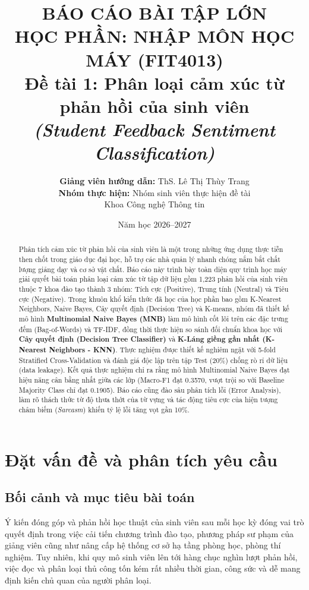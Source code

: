 \documentclass[12pt,a4paper]{article}
\title{\textbf{BÁO CÁO BÀI TẬP LỚN}\\
\textbf{HỌC PHẦN: NHẬP MÔN HỌC MÁY (FIT4013)}\\
\large \textbf{Đề tài 1: Phân loại cảm xúc từ phản hồi của sinh viên}\\
\textit{(Student Feedback Sentiment Classification)}}
\author{
    \textbf{Giảng viên hướng dẫn:} ThS. Lê Thị Thùy Trang\\
    \textbf{Nhóm thực hiện:} Nhóm sinh viên thực hiện đề tài\\
    Khoa Công nghệ Thông tin
}
\date{Năm học 2026--2027}
\begin{document}
\maketitle

\begin{abstract}
Phân tích cảm xúc từ phản hồi của sinh viên là một trong những ứng dụng thực tiễn then chốt trong giáo dục đại học, hỗ trợ các nhà quản lý nhanh chóng nắm bắt chất lượng giảng dạy và cơ sở vật chất. Báo cáo này trình bày toàn diện quy trình học máy giải quyết bài toán phân loại cảm xúc từ tập dữ liệu gồm 1,223 phản hồi của sinh viên thuộc 7 khoa đào tạo thành 3 nhóm: Tích cực (Positive), Trung tính (Neutral) và Tiêu cực (Negative). Trong khuôn khổ kiến thức đã học của học phần bao gồm K-Nearest Neighbors, Naive Bayes, Cây quyết định (Decision Tree) và K-means, nhóm đã thiết kế mô hình \textbf{Multinomial Naive Bayes (MNB)} làm mô hình cốt lõi trên các đặc trưng đếm (Bag-of-Words) và TF-IDF, đồng thời thực hiện so sánh đối chuẩn khoa học với \textbf{Cây quyết định (Decision Tree Classifier)} và \textbf{K-Láng giềng gần nhất (K-Nearest Neighbors - KNN)}. Thực nghiệm được thiết kế nghiêm ngặt với 5-fold Stratified Cross-Validation và đánh giá độc lập trên tập Test (20\%) chống rò rỉ dữ liệu (data leakage). Kết quả thực nghiệm chỉ ra rằng mô hình Multinomial Naive Bayes đạt hiệu năng cân bằng nhất giữa các lớp (Macro-F1 đạt 0.3570, vượt trội so với Baseline Majority Class chỉ đạt 0.1905). Báo cáo cũng đào sâu phân tích lỗi (Error Analysis), làm rõ thách thức từ độ thưa thớt của từ vựng và tác động tiêu cực của hiện tượng châm biếm (\textit{Sarcasm}) khiến tỷ lệ lỗi tăng vọt gần 10\%.
\end{abstract}

\newpage
\tableofcontents
\newpage

\section{Đặt vấn đề và phân tích yêu cầu}

\subsection{Bối cảnh và mục tiêu bài toán}
Ý kiến đóng góp và phản hồi học thuật của sinh viên sau mỗi học kỳ đóng vai trò quyết định trong việc cải tiến chương trình đào tạo, phương pháp sư phạm của giảng viên cũng như nâng cấp hệ thống cơ sở hạ tầng phòng học, phòng thí nghiệm. Tuy nhiên, khi quy mô sinh viên lên tới hàng chục nghìn lượt phản hồi, việc đọc và phân loại thủ công tốn kém rất nhiều thời gian, công sức và dễ mang định kiến chủ quan của người phân loại.
\end{document}

